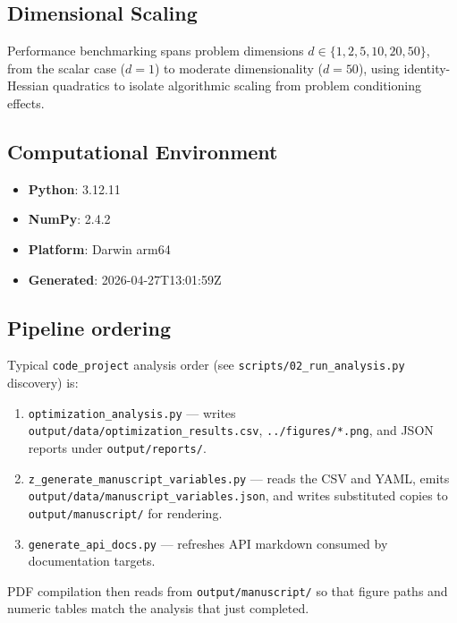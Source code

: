 \documentclass[
]{article}
\providecommand{\tightlist}{%
  \setlength{\itemsep}{0pt}\setlength{\parskip}{0pt}}
\begin{document}
\subsection{Dimensional Scaling}\label{dimensional-scaling}

Performance benchmarking spans problem dimensions
\(d \in \{1, 2, 5, 10, 20, 50\}\), from the scalar case (\(d = 1\)) to
moderate dimensionality (\(d = 50\)), using identity-Hessian quadratics
to isolate algorithmic scaling from problem conditioning effects.

\subsection{Computational Environment}\label{computational-environment}

\begin{itemize}
\tightlist
\item
  \textbf{Python}: 3.12.11
\item
  \textbf{NumPy}: 2.4.2
\item
  \textbf{Platform}: Darwin arm64
\item
  \textbf{Generated}: 2026-04-27T13:01:59Z
\end{itemize}

\subsection{Pipeline ordering}\label{pipeline-ordering}

Typical \texttt{code\_project} analysis order (see
\texttt{scripts/02\_run\_analysis.py} discovery) is:

\begin{enumerate}
\def\labelenumi{\arabic{enumi}.}
\tightlist
\item
  \texttt{optimization\_analysis.py} --- writes
  \texttt{output/data/optimization\_results.csv},
  \texttt{../figures/*.png}, and JSON reports under
  \texttt{output/reports/}.
\item
  \texttt{z\_generate\_manuscript\_variables.py} --- reads the CSV and
  YAML, emits \texttt{output/data/manuscript\_variables.json}, and
  writes substituted copies to \texttt{output/manuscript/} for
  rendering.
\item
  \texttt{generate\_api\_docs.py} --- refreshes API markdown consumed by
  documentation targets.
\end{enumerate}

PDF compilation then reads from \texttt{output/manuscript/} so that
figure paths and numeric tables match the analysis that just completed.
\end{document}
